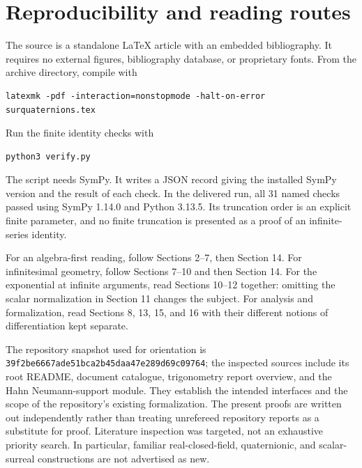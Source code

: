 \documentclass[11pt,letterpaper]{article}
\theoremstyle{definition}
\begin{document}
\section{Reproducibility and reading routes}
\label{app:reproduce}
The source is a standalone LaTeX article with an embedded bibliography. It
requires no external figures, bibliography database, or proprietary fonts.
From the archive directory, compile with
\begin{verbatim}
latexmk -pdf -interaction=nonstopmode -halt-on-error surquaternions.tex
\end{verbatim}
Run the finite identity checks with
\begin{verbatim}
python3 verify.py
\end{verbatim}
The script needs SymPy. It writes a JSON record giving the installed SymPy
version and the result of each check. In the delivered run, all 31 named
checks passed using SymPy 1.14.0 and Python 3.13.5. Its truncation order is an explicit
finite parameter, and no finite truncation is presented as a proof of an
infinite-series identity.

For an algebra-first reading, follow Sections 2--7, then Section 14. For
infinitesimal geometry, follow Sections 7--10 and then Section 14. For the
exponential at infinite arguments, read Sections 10--12 together: omitting
the scalar normalization in Section 11 changes the subject. For analysis and
formalization, read Sections 8, 13, 15, and 16 with their different notions of
differentiation kept separate.

The repository snapshot used for orientation is
\texttt{39f2be6667ade51bca2b45daa47e289d69c09764}; the inspected sources include
its root README, document catalogue, trigonometry report overview, and the
Hahn Neumann-support module. They establish the intended interfaces and the
scope of the repository's existing formalization. The present proofs are
written out independently rather than treating unrefereed repository reports
as a substitute for proof. Literature inspection was targeted, not an
exhaustive priority search. In particular, familiar real-closed-field,
quaternionic, and scalar-surreal constructions are not advertised as new.
\end{document}
